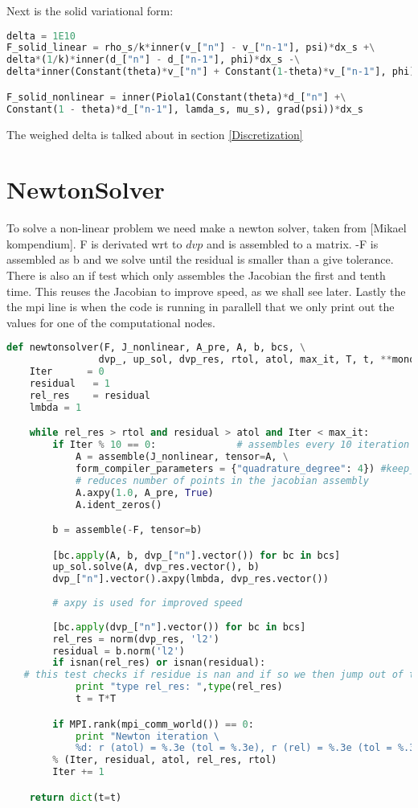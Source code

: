 Next is the solid variational form:
\begin{lstlisting}[language=Python, basicstyle=\small]
delta = 1E10
F_solid_linear = rho_s/k*inner(v_["n"] - v_["n-1"], psi)*dx_s +\
delta*(1/k)*inner(d_["n"] - d_["n-1"], phi)*dx_s -\
delta*inner(Constant(theta)*v_["n"] + Constant(1-theta)*v_["n-1"], phi)*dx_s

F_solid_nonlinear = inner(Piola1(Constant(theta)*d_["n"] +\
Constant(1 - theta)*d_["n-1"], lamda_s, mu_s), grad(psi))*dx_s
\end{lstlisting}

The weighed delta is talked about in section \ref{Discretization}

\section{NewtonSolver}
To solve a non-linear problem we need make a newton solver, taken from [Mikael kompendium]. F is derivated wrt to $dvp$ and is assembled to a matrix. -F is assembled as b and we solve until the residual is smaller than a give tolerance. There is also an if test which only assembles the Jacobian the first and tenth time. This reuses the Jacobian to improve speed, as we shall see later. Lastly the the mpi line is when the code is running in parallell that we only print out the values for one of the computational nodes.  
\begin{lstlisting}[language=Python, basicstyle=\small]
def newtonsolver(F, J_nonlinear, A_pre, A, b, bcs, \
                dvp_, up_sol, dvp_res, rtol, atol, max_it, T, t, **monolithic):
    Iter      = 0
    residual   = 1
    rel_res    = residual
    lmbda = 1

    while rel_res > rtol and residual > atol and Iter < max_it:
        if Iter % 10 == 0:              # assembles every 10 iteration
            A = assemble(J_nonlinear, tensor=A, \
            form_compiler_parameters = {"quadrature_degree": 4}) #keep_diagonal = True 
            # reduces number of points in the jacobian assembly
            A.axpy(1.0, A_pre, True)
            A.ident_zeros()        

        b = assemble(-F, tensor=b)

        [bc.apply(A, b, dvp_["n"].vector()) for bc in bcs]
        up_sol.solve(A, dvp_res.vector(), b)
        dvp_["n"].vector().axpy(lmbda, dvp_res.vector())  
        
        # axpy is used for improved speed
        
        [bc.apply(dvp_["n"].vector()) for bc in bcs]
        rel_res = norm(dvp_res, 'l2')
        residual = b.norm('l2')
        if isnan(rel_res) or isnan(residual): 
   # this test checks if residue is nan and if so we then jump out of the time loop. 
            print "type rel_res: ",type(rel_res)
            t = T*T

        if MPI.rank(mpi_comm_world()) == 0:
            print "Newton iteration \
            %d: r (atol) = %.3e (tol = %.3e), r (rel) = %.3e (tol = %.3e) " \
        % (Iter, residual, atol, rel_res, rtol)
        Iter += 1

    return dict(t=t)
\end{lstlisting}


